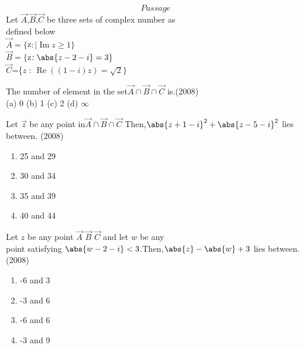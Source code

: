 \iffalse
    \title{Assignment}
    \author{Shreyansh Sonkar - ai24btech11032}
    \section{paragraph}
  \fi
$$Passage$$
Let $\vec{A}$,$\vec{B}$,$\vec{C}$ be three sets of complex number as\\ defined below\\$\vec{A} = \{ $z$ :\mid \operatorname{Im}z\geq1\}$\\$\vec{B}=\{$z$:\abs{z-2-i}=3\}$\\$\vec{C}$=\{$z$ : $\operatorname{Re} \left((1-i)z\right) = \sqrt{2} \}$\\
\item The number of element in the set$\vec{A} \cap\vec{B} \cap\vec{C} $ is.\hfill (2008)\\
   (a) 0 \hfill
   (b) 1 \hfill
   (c) 2 \hfill
   (d) $\infty$\\
\item Let $\vec{z}$ be any point in$ \vec{A}\cap\vec{B}\cap\vec{C} $ Then,$\abs{z+1-i}^2+\abs{z-5-i}^2$ lies between. \hfill  (2008) 
\begin{multicols}{2}
    \begin{enumerate}
        \item 25 and 29
        \item 30 and 34
        \item 35 and 39
        \item 40 and 44
    \end{enumerate}
\end{multicols}
\item  Let $z$ be any point $\vec{A}$ $\vec{B}$ $\vec{C}$ and let $w$ be any\\point satisfying $\abs{w-2-i}<3$.Then,$\abs{z}-\abs{w}+3$ lies between.\hfill (2008) 
 \begin{multicols}{2}
  \begin{enumerate}
    \item -6 and 3
    \item -3 and 6 
    \item -6 and 6
    \item -3 and 9
  \end{enumerate}
 \end{multicols}
